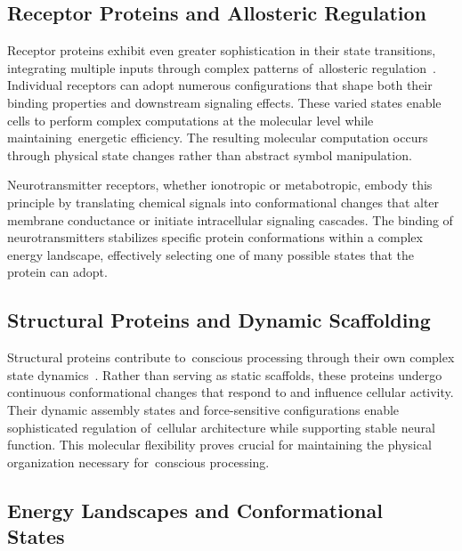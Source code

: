 \subsection*{Receptor Proteins and Allosteric Regulation~}

Receptor proteins exhibit even greater sophistication in their state transitions, integrating multiple inputs through complex patterns of~allosteric regulation~\cite{Nussinov2013, Choquet2013}. Individual receptors can adopt numerous configurations that shape both their binding properties and downstream signaling effects. These varied states enable cells to perform complex computations at the molecular level while maintaining~energetic efficiency. The resulting molecular computation occurs through physical state changes rather than abstract symbol manipulation.

Neurotransmitter receptors, whether ionotropic or metabotropic, embody this principle by translating chemical signals into conformational changes that alter membrane conductance or initiate intracellular signaling cascades. The binding of neurotransmitters stabilizes specific protein conformations within a complex energy landscape, effectively selecting one of many possible states that the protein can adopt.

\subsection*{Structural Proteins and Dynamic Scaffolding~}

Structural proteins contribute to~conscious processing through their own complex state dynamics~\cite{Frauenfelder2009, Fletcher2010}. Rather than serving as static scaffolds, these proteins undergo continuous conformational changes that respond to and influence cellular activity. Their dynamic assembly states and force-sensitive configurations enable sophisticated regulation of~cellular architecture while supporting stable neural function. This molecular flexibility proves crucial for maintaining the physical organization necessary for~conscious processing.

\subsection*{Energy Landscapes and Conformational States~}

